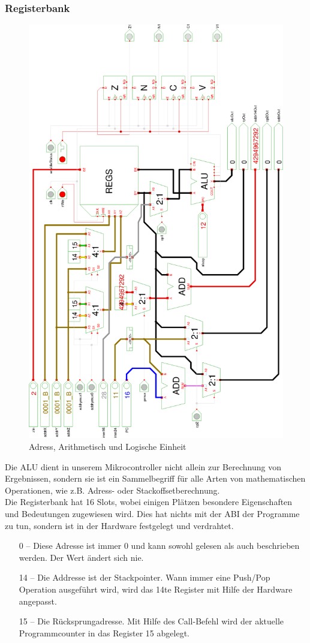 \subsubsection{Registerbank}
\begin{figure}[!ht]
\centering
\includegraphics[width=.8\textwidth]{images/alu.eps}
\caption{\label{HW:ALU}Adress, Arithmetisch und Logische Einheit}
\end{figure}
Die ALU dient in unserem Mikrocontroller nicht allein zur Berechnung von Ergebnissen, sondern sie ist ein Sammelbegriff für alle Arten von mathematischen Operationen, wie z.B. Adress- oder Stackoffsetberechnung.\\
Die Registerbank hat 16 Slots, wobei einigen Plätzen besondere Eigenschaften und Bedeutungen zugewiesen wird. Dies hat nichts mit der ABI der Programme zu tun, sondern ist in der Hardware festgelegt und verdrahtet.
\begin{itemize}
  \item[0 --] Diese Adresse ist immer 0 und kann sowohl gelesen als auch beschrieben werden. Der Wert ändert sich nie.
  \item[14 --] Die Addresse ist der Stackpointer. Wann immer eine Push/Pop Operation ausgeführt wird, wird das 14te Register mit Hilfe der Hardware angepasst.
  \item[15 --] Die Rücksprungadresse. Mit Hilfe des Call-Befehl wird der aktuelle Programmcounter in das Register 15 abgelegt.
\end{itemize}
